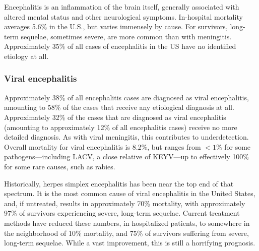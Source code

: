 \documentclass[12pt]{article}
\newcommand{\cjh}{\textcolor{blue}{cjh}}
\newcommand{\msg}[3]{(#1 $\rightarrow$ #2: #3)}
\newcommand{\mcc}[1]{\msg\cjh\cjh{#1}}
\begin{document}
            Encephalitis is an inflammation of the brain itself, generally associated with altered mental status and other neurological symptoms. In-hospital mortality averages 5.6\% in the U.S., but varies immensely by cause. For survivors, long-term sequelae, sometimes severe, are more common than with meningitis. Approximately 35\% of all cases of encephalitis in the US have no identified etiology at all\cite{george2014encephalitis}.
            
        \subsubsection{Viral encephalitis}
            \label{viral-encephalitis}
            Approximately 38\% of all encephalitis cases are diagnosed as viral encephalitis, amounting to 58\% of the cases that receive any etiological diagnosis at all. Approximately 32\% of the cases that are diagnosed as viral encephalitis (amounting to approximately 12\% of all encephalitis cases) receive no more detailed diagnosis. As with viral meningitis, this contributes to underdetection. Overall mortality for viral encephalitis is 8.2\%, but ranges from $<1\%$ for some pathogens---including LACV, a close relative of KEYV---up to effectively 100\% for some rare causes, such as rabies\cite{george2014encephalitis}.

            Historically, herpes simplex encephalitis has been near the top end of that spectrum. It is the most common cause of viral encephalitis in the United States, and, if untreated, results in approximately 70\% mortality, with approximately 97\% of survivors experiencing severe, long-term sequelae. Current treatment methods have reduced these numbers, in hospitalized patients, to somewhere in the neighborhood of 10\% mortality, and 75\% of survivors suffering from severe, long-term sequelae\cite{bradshaw2016herpes}. While a vast improvement, this is still a horrifying prognosis.
            
\end{document}
